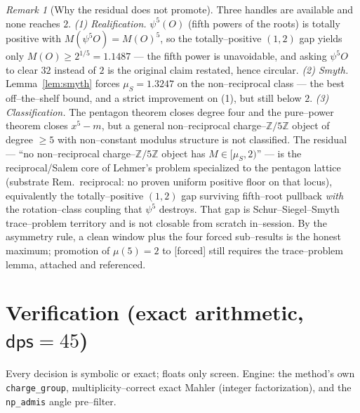 \documentclass[11pt]{article}
\newcommand{\forced}{\textcolor{cforced}{\textsf{[forced]}}}
\newcommand{\Z}{\mathbb{Z}}
\newcommand{\Mah}{M}
\newcommand{\muS}{\mu_S}
\newcommand{\Zfive}{\Z/5\Z}
\theoremstyle{plain}
\theoremstyle{definition}
\theoremstyle{remark}
\newtheorem{remark}[theorem]{Remark}
\begin{document}
\begin{remark}[Why the residual does not promote]\label{rem:notforced}
Three handles are available and none reaches $2$.
\emph{(1) Realification.} $\psi^5(O)$ (fifth powers of the roots) is totally positive with
$\Mah(\psi^5O)=\Mah(O)^5$, so the totally--positive $(1,2)$ gap yields only $\Mah(O)\ge2^{1/5}=1.1487$
--- the fifth power is unavoidable, and asking $\psi^5O$ to clear $32$ instead of $2$ is the original
claim restated, hence circular.
\emph{(2) Smyth.} Lemma~\ref{lem:smyth} forces $\muS=1.3247$ on the non--reciprocal class --- the
best off--the--shelf bound, and a strict improvement on (1), but still below $2$.
\emph{(3) Classification.} The pentagon theorem closes degree four and the pure--power theorem closes
$x^5-m$, but a general non--reciprocal charge--$\Zfive$ object of degree $\ge5$ with non--constant
modulus structure is not classified.
The residual --- ``no non--reciprocal charge--$\Zfive$ object has $\Mah\in[\muS,2)$'' --- is the
reciprocal/Salem core of Lehmer's problem specialized to the pentagon lattice (substrate
Rem.~\textup{reciprocal}: no proven uniform positive floor on that locus), equivalently the
totally--positive $(1,2)$ gap surviving fifth--root pullback \emph{with} the rotation--class coupling
that $\psi^5$ destroys. That gap is Schur--Siegel--Smyth trace--problem territory and is not closable
from scratch in--session. By the asymmetry rule, a clean window plus the four forced sub--results is
the honest maximum; promotion of $\mu(5)=2$ to \forced{} still requires the trace--problem lemma,
attached and referenced.
\end{remark}

\section{Verification (exact arithmetic, \texorpdfstring{$\textsf{dps}=45$}{dps=45})}\label{sec:verify}

Every decision is symbolic or exact; floats only screen. Engine: the method's own
\texttt{charge\_group}, multiplicity--correct exact Mahler (integer factorization), and the
\texttt{np\_admis} angle pre--filter.
\end{document}
